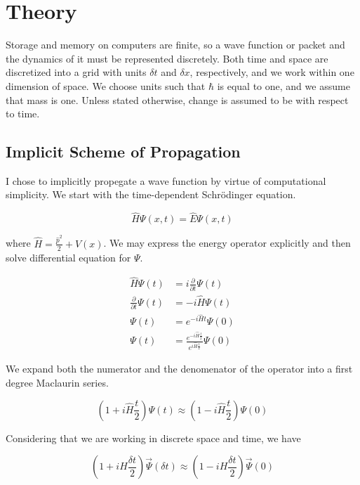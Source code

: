 \section*{Theory}

Storage and memory on computers are finite, so a wave function or packet and
the dynamics of it must be represented discretely. Both time and space are
discretized into a grid with units $\delta t$ and $\delta x$, respectively,
and we work within one dimension of space. We choose units such that $\hbar$
is equal to one, and we assume that mass is one. Unless stated otherwise,
change is assumed to be with respect to time.

\subsection*{Implicit Scheme of Propagation}

I chose to implicitly propegate a wave function by virtue of computational
simplicity. We start with the time-dependent Schrödinger equation.

\[
    \hat{H} \Psi(x, t) = \hat{E} \Psi(x, t)
\]

where $\hat{H} = \frac{\hat{p} ^ 2}{2} + V(x)$. We may express the energy
operator explicitly and then solve differential equation for $\Psi$.

\begin{align*}
    \hat{H} \Psi(t)
    &= i\frac{\partial}{\partial t} \Psi(t) \\
    \frac{\partial}{\partial t} \Psi(t)
    &= -i\hat{H} \Psi(t) \\
    \Psi(t) &= e^{-i\hat{H} t} \Psi(0) \\
    \Psi(t) &=
    \frac{e^{-i\hat{H} \frac{t}{2}}}{e^{i\hat{H} \frac{t}{2}}} \Psi(0)
\end{align*}

We expand both the numerator and the denomenator of the operator into a
first degree Maclaurin series.

\[
    \left( 1 + i\hat{H} \frac{t}{2} \right) \Psi(t) \approx
    \left( 1 - i\hat{H} \frac{t}{2} \right) \Psi(0)
\]

\pagebreak

Considering that we are working in discrete space and time, we have

\begin{equation}
    \left( 1 + iH \frac{\delta t}{2} \right) \vec{\Psi}(\delta t) \approx
    \left( 1 - iH \frac{\delta t}{2} \right) \vec{\Psi}(0)
    \label{eq:impsch}
\end{equation}

